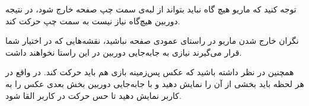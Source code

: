 \documentclass{utap}
\begin{document}
توجه کنید که ماریو هیچ گاه نباید بتواند از لبه‌ی سمت چپ صفحه خارج شود، در نتیجه دوربین هیچ‌گاه نیاز نیست به سمت چپ حرکت کند.

نگران خارج شدن ماریو در راستای عمودی صفحه نباشید، نقشه‌هایی که در اختیار شما قرار می‌گیرند نیازی به جابه‌جایی دوربین در این راستا نخواهند داشت.

همچنین در نظر داشته باشید که عکس پس‌زمینه بازی هم باید حرکت کند. در واقع در هر لحظه باید بخشی از آن را نمایش دهید و با جابه‌جایی دوربین بخش بعدی عکس را به کاربر نمایش دهید تا حس حرکت در کاربر القا شود.
\end{document}
